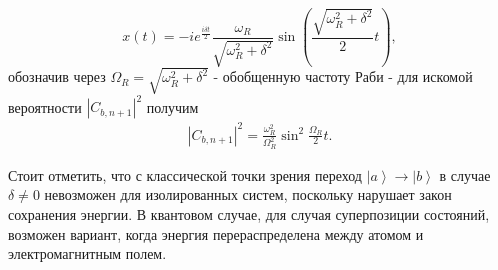 \begin{equation}
  x\left(t\right) = -  i e^{\frac{ i \delta t}{2}}
  \frac{\omega_R}{\sqrt{\omega_R^2 + \delta^2}}
  \sin{\left(\frac{\sqrt{\omega_R^2 + \delta^2}}{2}t\right)},
  \nonumber
\end{equation}
обозначив через $\Omega_R = \sqrt{\omega_R^2 + \delta^2}$ -
обобщенную частоту Раби - для искомой вероятности
$\left|C_{b,n+1}\right|^2$ получим
\begin{eqnarray}
  \left|C_{b,n+1}\right|^2 =  \frac{\omega_R^2}{\Omega_R^2}
  \sin^2{\frac{\Omega_R}{2} t}.
  \label{eqPart1InteractionRabiProbability}
\end{eqnarray}

Стоит отметить, что с классической точки зрения переход
$\left|a\right> \rightarrow \left|b\right>$ в случае $\delta \ne 0$
невозможен для изолированных систем, поскольку нарушает закон
сохранения энергии. В квантовом случае, для случая суперпозиции
состояний, возможен вариант, когда энергия перераспределена между
атомом и электромагнитным полем. 
